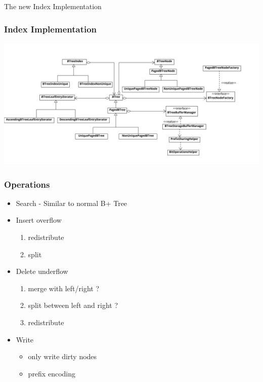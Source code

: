 \documentclass{beamer}
\begin{document}
  \begin{section}{The new Index Implementation}
    \begin{frame}
        \frametitle{Index Implementation}
        \includegraphics[scale=0.065]{ZooDBClassDiagram} 
    \end{frame}

    \begin{frame}
        \frametitle{Operations}
        \begin{itemize}
        \item Search - Similar to normal B+ Tree
        \pause
        \item Insert overflow
            \begin{enumerate}
            \item redistribute
            \item split 
            \end{enumerate}
        \pause
        \item Delete underflow
            \begin{enumerate}
            \item merge with left/right ?
            \item split between left and right ?
            \item redistribute
            \end{enumerate}
        \pause
        \item Write
            \begin{itemize}
              \item only write dirty nodes
              \item prefix encoding
            \end{itemize}
        \end{itemize}
    \end{frame}
  \end{section}
\end{document}
